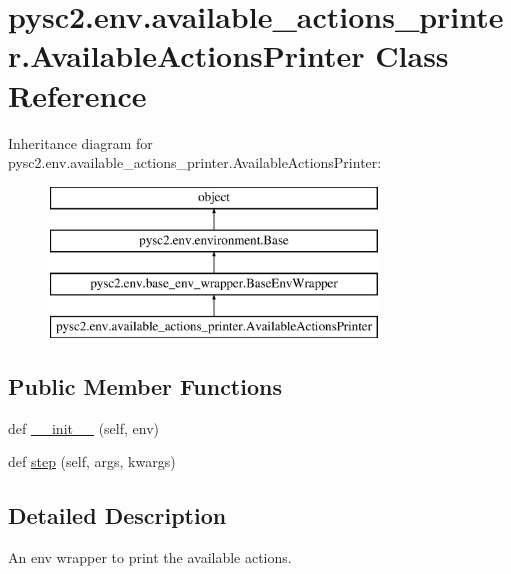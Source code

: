 \hypertarget{classpysc2_1_1env_1_1available__actions__printer_1_1_available_actions_printer}{}\section{pysc2.\+env.\+available\+\_\+actions\+\_\+printer.\+Available\+Actions\+Printer Class Reference}
\label{classpysc2_1_1env_1_1available__actions__printer_1_1_available_actions_printer}
Inheritance diagram for pysc2.\+env.\+available\+\_\+actions\+\_\+printer.\+Available\+Actions\+Printer\+:\begin{figure}[H]
\begin{center}
\leavevmode
\includegraphics[height=4.000000cm]{classpysc2_1_1env_1_1available__actions__printer_1_1_available_actions_printer}
\end{center}
\end{figure}
\subsection*{Public Member Functions}
\begin{DoxyCompactItemize}
\item 
def \mbox{\hyperlink{classpysc2_1_1env_1_1available__actions__printer_1_1_available_actions_printer_a65c7b508da0d9b5c0b0f9e8bec02e5c3}{\+\_\+\+\_\+init\+\_\+\+\_\+}} (self, env)
\item 
def \mbox{\hyperlink{classpysc2_1_1env_1_1available__actions__printer_1_1_available_actions_printer_a4a58432803a5d2b7ea60107f71dc2d86}{step}} (self, args, kwargs)
\end{DoxyCompactItemize}


\subsection{Detailed Description}
\begin{DoxyVerb}An env wrapper to print the available actions.\end{DoxyVerb}
 

